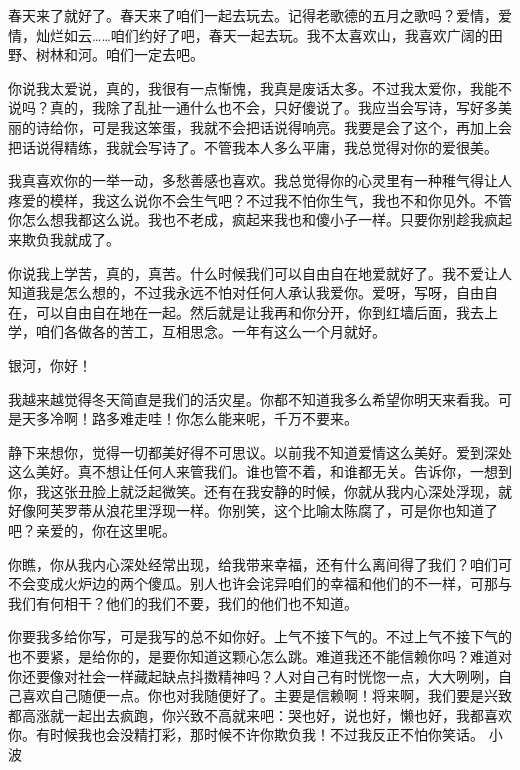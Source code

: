 春天来了就好了。春天来了咱们一起去玩去。记得老歌德的五月之歌吗？爱情，爱情，灿烂如云……咱们约好了吧，春天一起去玩。我不太喜欢山，我喜欢广阔的田野、树林和河。咱们一定去吧。 

你说我太爱说，真的，我很有一点惭愧，我真是废话太多。不过我太爱你，我能不说吗？真的，我除了乱扯一通什么也不会，只好傻说了。我应当会写诗，写好多美丽的诗给你，可是我这笨蛋，我就不会把话说得响亮。我要是会了这个，再加上会把话说得精练，我就会写诗了。不管我本人多么平庸，我总觉得对你的爱很美。 

我真喜欢你的一举一动，多愁善感也喜欢。我总觉得你的心灵里有一种稚气得让人疼爱的模样，我这么说你不会生气吧？不过我不怕你生气，我也不和你见外。不管你怎么想我都这么说。我也不老成，疯起来我也和傻小子一样。只要你别趁我疯起来欺负我就成了。 

你说我上学苦，真的，真苦。什么时候我们可以自由自在地爱就好了。我不爱让人知道我是怎么想的，不过我永远不怕对任何人承认我爱你。爱呀，写呀，自由自在，可以自由自在地在一起。然后就是让我再和你分开，你到红墙后面，我去上学，咱们各做各的苦工，互相思念。一年有这么一个月就好。 

银河，你好！ 

我越来越觉得冬天简直是我们的活灾星。你都不知道我多么希望你明天来看我。可是天多冷啊！路多难走哇！你怎么能来呢，千万不要来。 

静下来想你，觉得一切都美好得不可思议。以前我不知道爱情这么美好。爱到深处这么美好。真不想让任何人来管我们。谁也管不着，和谁都无关。告诉你，一想到你，我这张丑脸上就泛起微笑。还有在我安静的时候，你就从我内心深处浮现，就好像阿芙罗蒂从浪花里浮现一样。你别笑，这个比喻太陈腐了，可是你也知道了吧？亲爱的，你在这里呢。 

你瞧，你从我内心深处经常出现，给我带来幸福，还有什么离间得了我们？咱们可不会变成火炉边的两个傻瓜。别人也许会诧异咱们的幸福和他们的不一样，可那与我们有何相干？他们的我们不要，我们的他们也不知道。 

你要我多给你写，可是我写的总不如你好。上气不接下气的。不过上气不接下气的也不要紧，是给你的，是要你知道这颗心怎么跳。难道我还不能信赖你吗？难道对你还要像对社会一样藏起缺点抖擞精神吗？人对自己有时恍惚一点，大大咧咧，自己喜欢自己随便一点。你也对我随便好了。主要是信赖啊！将来啊，我们要是兴致都高涨就一起出去疯跑，你兴致不高就来吧：哭也好，说也好，懒也好，我都喜欢你。有时候我也会没精打彩，那时候不许你欺负我！不过我反正不怕你笑话。 小波
